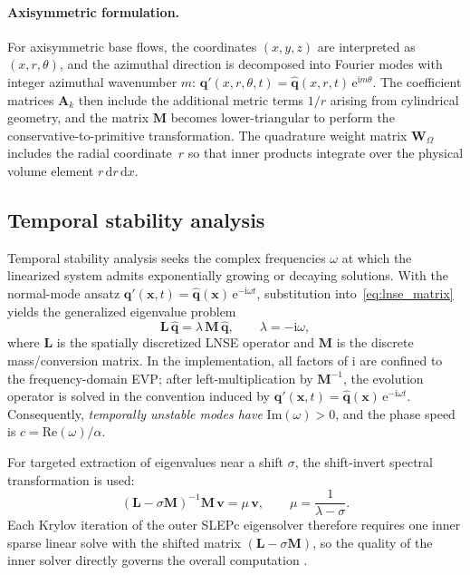 \documentclass[11pt]{article}
\newcommand{\dd}{\mathrm{d}}
\newcommand{\bq}{\mathbf{q}}
\newcommand{\bqp}{\mathbf{q}'}
\newcommand{\bx}{\mathbf{x}}
\newcommand{\bA}{\mathbf{A}}
\newcommand{\bL}{\mathbf{L}}
\newcommand{\bM}{\mathbf{M}}
\newcommand{\bW}{\mathbf{W}}
\newcommand{\bv}{\mathbf{v}}
\begin{document}
\paragraph{Axisymmetric formulation.}
For axisymmetric base flows, the coordinates $(x,y,z)$ are interpreted as $(x,r,\theta)$, and the azimuthal direction is decomposed into Fourier modes with integer azimuthal wavenumber $m$:
$\bqp(x,r,\theta,t) = \hat{\bq}(x,r,t)\,\mathrm{e}^{\mathrm{i} m\theta}$.
The coefficient matrices $\bA_k$ then include the additional metric terms $1/r$ arising from cylindrical geometry, and the matrix $\bM$ becomes lower-triangular to perform the conservative-to-primitive transformation.
The quadrature weight matrix $\bW_\Omega$ includes the radial coordinate~$r$ so that inner products integrate over the physical volume element $r\,\dd r\,\dd x$.

\subsection{Temporal stability analysis}
\label{sec:temporal}

Temporal stability analysis seeks the complex frequencies $\omega$ at which the linearized system admits exponentially growing or decaying solutions.
With the normal-mode ansatz $\bqp(\bx,t) = \hat{\bq}(\bx)\,\mathrm{e}^{-\mathrm{i}\omega t}$, substitution into~\eqref{eq:lnse_matrix} yields the generalized eigenvalue problem
\begin{equation}
  \bL\,\hat{\bq} = \lambda\,\bM\,\hat{\bq},
  \qquad \lambda = -\mathrm{i}\omega,
  \label{eq:gevp}
\end{equation}
where $\bL$ is the spatially discretized LNSE operator and $\bM$ is the discrete mass/conversion matrix.
In the implementation, all factors of $\mathrm{i}$ are confined to the frequency-domain EVP; after left-multiplication by $\bM^{-1}$, the evolution operator is solved in the convention induced by $\bqp(\bx,t)=\hat{\bq}(\bx)\,\mathrm{e}^{-\mathrm{i}\omega t}$.
Consequently, \emph{temporally unstable modes have} $\mathrm{Im}(\omega) > 0$, and the phase speed is $c = \mathrm{Re}(\omega)/\alpha$.

For targeted extraction of eigenvalues near a shift $\sigma$, the shift-invert spectral transformation is used:
\begin{equation}
  (\bL - \sigma\bM)^{-1}\bM\,\bv = \mu\,\bv,
  \qquad \mu = \frac{1}{\lambda - \sigma}.
  \label{eq:shift_invert}
\end{equation}
Each Krylov iteration of the outer SLEPc eigensolver therefore requires one inner sparse linear solve with the shifted matrix $(\bL - \sigma\bM)$, so the quality of the inner solver directly governs the overall computation \cite{frantz2023krylov}.
\end{document}
